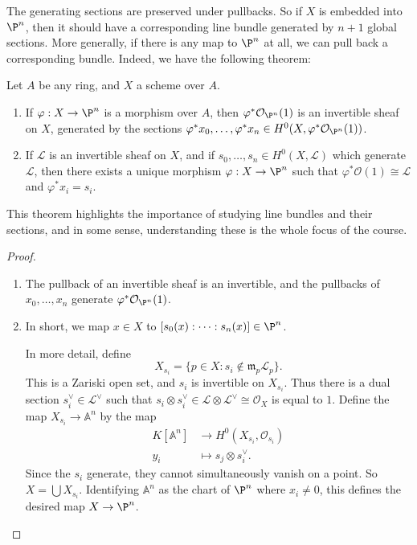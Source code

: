 \documentclass[a4paper]{article}
\newcommand\A{\mathbb{A}}
\begin{document}
The generating sections are preserved under pullbacks. So if $X$ is embedded into $\P^n$, then it should have a corresponding line bundle generated by $n + 1$ global sections. More generally, if there is any map to $\P^n$ at all, we can pull back a corresponding bundle. Indeed, we have the following theorem:
\begin{thm}
  Let $A$ be any ring, and $X$ a scheme over $A$.
  \begin{enumerate}
    \item If $\varphi: X \to \P^n$ is a morphism over $A$, then $\varphi^* \mathcal{O}_{\P^n}(1)$ is an invertible sheaf on $X$, generated by the sections $\varphi^* x_0, \ldots, \varphi^* x_n \in H^0(X, \varphi^* \mathcal{O}_{\P^n}(1))$.
    \item If $\mathcal{L}$ is an invertible sheaf on $X$, and if $s_0, \ldots, s_n \in H^0(X, \mathcal{L})$ which generate $\mathcal{L}$, then there exists a unique morphism $\varphi: X \to \P^n$ such that $\varphi^* \mathcal{O}(1) \cong \mathcal{L}$ and $\varphi^* x_i = s_i$.
  \end{enumerate}
\end{thm}

This theorem highlights the importance of studying line bundles and their sections, and in some sense, understanding these is the whole focus of the course.

\begin{proof}\leavevmode
  \begin{enumerate}
    \item The pullback of an invertible sheaf is an invertible, and the pullbacks of $x_0, \ldots, x_n$ generate $\varphi^* \mathcal{O}_{\P^n}(1)$.

    \item In short, we map $x \in X$ to $[s_0(x): \cdots : s_n(x)] \in \P^n$.

      In more detail, define
      \[
        X_{s_i} = \{p \in X: s_i \not\in \mathfrak{m}_p \mathcal{L}_p\}.
      \]
      This is a Zariski open set, and $s_i$ is invertible on $X_{s_i}$. Thus there is a dual section $s_i^\vee \in \mathcal{L}^{\vee}$ such that $s_i \otimes s_i^\vee \in \mathcal{L} \otimes \mathcal{L}^\vee \cong \mathcal{O}_X$ is equal to $1$. Define the map $X_{s_i} \to \A^n$ by the map
      \begin{align*}
        K[\A^n] &\to H^0(X_{s_i}, \mathcal{O}_{s_i})\\
        y_i &\mapsto s_j \otimes s_i^\vee.
      \end{align*}
      Since the $s_i$ generate, they cannot simultaneously vanish on a point. So $X = \bigcup X_{s_i}$. Identifying $\A^n$ as the chart of $\P^n$ where $x_i \not= 0$, this defines the desired map $X \to \P^n$.\qedhere
  \end{enumerate}
\end{proof}
\end{document}
